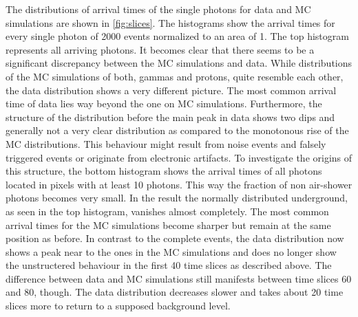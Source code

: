 The distributions of arrival times of the single photons for data and MC
simulations are shown in \autoref{fig:slices}. The histograms show the arrival
times for every single photon of 2000 events normalized to an area of 1. The
top histogram represents all arriving photons. It becomes clear that there
seems to be a significant discrepancy between the MC simulations and data.
While distributions of the MC simulations of both, gammas and protons, quite
resemble each other, the data distribution shows a very different picture. The
most common arrival time of data lies way beyond the one on MC simulations.
Furthermore, the structure of the distribution before the main peak in data
shows two dips and generally not a very clear distribution as compared to the
monotonous rise of the MC distributions. This behaviour might result from noise
events and falsely triggered events or originate from electronic artifacts. To
investigate the origins of this structure, the bottom histogram shows the
arrival times of all photons located in pixels with at least \num{10} photons.
This way the fraction of non air-shower photons becomes very small. In the
result the normally distributed underground, as seen in the top histogram,
vanishes almost completely. The most common arrival times for the MC
simulations become sharper but remain at the same position as before. In
contrast to the complete events, the data distribution now shows a peak near to
the ones in the MC simulations and does no longer show the unstructered
behaviour in the first \num{40} time slices as described above. The difference
between data and MC simulations still manifests between time slices \num{60}
and \num{80}, though. The data distribution decreases slower and takes about
\num{20} time slices more to return to a supposed background level.
%

